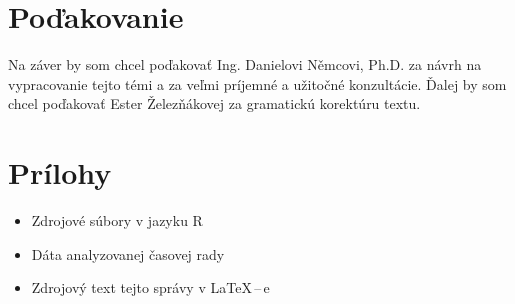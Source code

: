 \documentclass[12pt,a4paper,oneside,final]{article}
\theoremstyle{definition}
\theoremstyle{remark}
\numberwithin{equation}{section}
\begin{document}
\section*{Poďakovanie}
Na záver by som chcel poďakovať Ing. Danielovi Němcovi, Ph.D. za návrh na vypracovanie
tejto témi a za veľmi príjemné a užitočné konzultácie. Ďalej by som chcel poďakovať Ester
Železňákovej za gramatickú korektúru textu.




\newpage
\renewcommand{\thesection}{\Alph{section}}
\setcounter{section}{0}
\renewcommand{\thepage}{\roman{page}}
\setcounter{page}{1}

\section{Prílohy}

\begin{itemize}
    \item Zdrojové súbory v jazyku R
    \item Dáta analyzovanej časovej rady
    \item Zdrojový text tejto správy v \LaTeX\,--\,e
\end{itemize}
\end{document}
